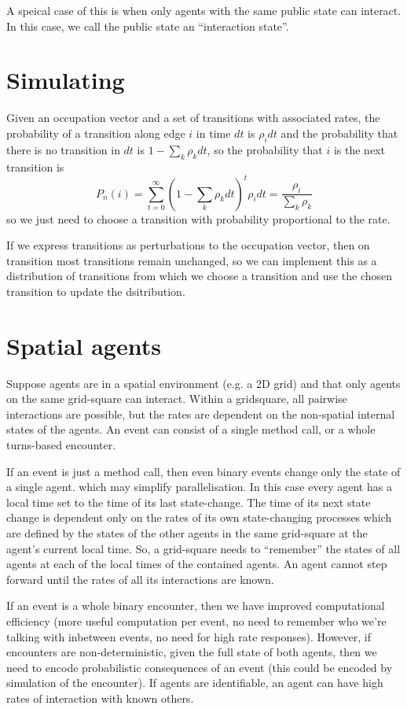 \documentclass[a4paper]{article}
\begin{document}
A speical case of this is when only agents with the same public state can interact. In this case, we call the public state an ``interaction state''.

\section{Simulating}

Given an occupation vector and a set of transitions with associated rates, the probability of a transition along edge $i$ in time $dt$ is $\rho_i dt$ and the probability that there is no transition in $dt$ is $1-\sum_k \rho_k dt$, so the probability that $i$ is the next transition is
\[
P_n(i) = \sum_{t=0}^\infty (1-\sum_k \rho_k dt)^t \rho_i dt = \frac{\rho_i}{\sum_k \rho_k}
\]
so we just need to choose a transition with probability proportional to the rate.

If we express transitions as perturbations to the occupation vector, then on transition most transitions remain unchanged, so we can implement this as a distribution of transitions from which we choose a transition and use the chosen transition to update the dsitribution.

\section{Spatial agents}

Suppose agents are in a spatial environment (e.g. a 2D grid) and that only agents on the same grid-square can interact. Within a gridsquare, all pairwise interactions are possible, but the rates are dependent on the non-spatial internal states of the agents. An event can consist of a single method call, or a whole turns-based encounter.

If an event is just a method call, then even binary events change only the state of a single agent. which may simplify parallelisation. In this case every agent has a local time set to the time of its last state-change. The time of its next state change is dependent only on the rates of its own state-changing processes which are defined by the states of the other agents in the same grid-square at the agent's current local time. So, a grid-square needs to ``remember'' the states of all agents at each of the local times of the contained agents. An agent cannot step forward until the rates of all its interactions are known.

If an event is a whole binary encounter, then we have improved computational efficiency (more useful computation per event, no need to remember who we're talking with inbetween events, no need for high rate responses). However, if encounters are non-deterministic, given the full state of both agents, then we need to encode probabilistic consequences of an event (this could be encoded by simulation of the encounter). If agents are identifiable, an agent can have high rates of interaction with known others.
\end{document}
